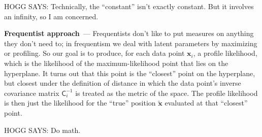 \documentclass{article}
\renewcommand{\paragraph}[1]{\bigskip\par\noindent\textbf{#1}~---}
\renewcommand{\vec}[1]{\bm{#1}}
\newcommand{\mat}[1]{\mathsf{#1}}
\begin{document}
HOGG SAYS: Technically, the ``constant'' isn't exactly constant. But it involves an infinity, so I am concerned.

\paragraph{Frequentist approach}
Frequentists don't like to put measures on anything they don't need to; in frequentism we deal with latent parameters by maximizing or profiling.
So our goal is to produce, for each data point $\vec{x}_i$, a profile likelihood, which is the likelihood of the maximum-likelihood point that lies on the hyperplane.
It turns out that this point is the ``closest'' point on the hyperplane, but closest under the definition of distance in which the data point's inverse covariance matrix $\mat{C}_i^{-1}$ is treated as the metric of the space.
The profile likelihood is then just the likelihood for the ``true'' position $\vec{\tilde{x}}$ evaluated at that ``closest'' point.

HOGG SAYS: Do math.

\raggedright


\end{document}
